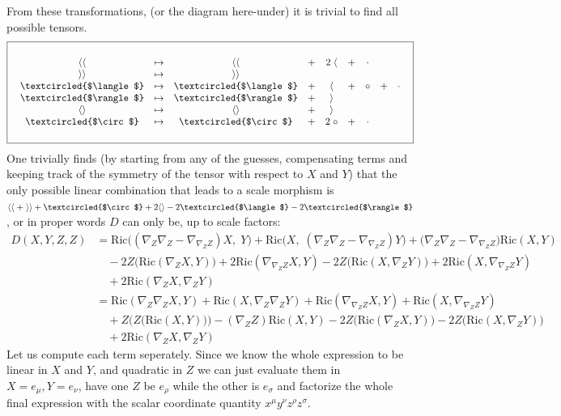 \documentclass[a4paper,11pt]{article}
\numberwithin{equation}{section}
\theoremstyle{definition}
\newcommand{\R}{{\mathrm{Ric}}}
\begin{document}
From these transformations, (or the diagram here-under) it is trivial to find all possible tensors.
\begin{equation}
\boxed{\quad \begin{matrix}
    \quad\\
    \langle\langle & \mapsto  &   \langle\langle & + & 2 \; \langle & + & \cdot \\
    \rangle\rangle & \mapsto &   \rangle\rangle \\
    \textcircled{$\langle$} & \mapsto &   \textcircled{$\langle$} & + & \langle & + & \circ & + & \cdot \\
    \textcircled{$\rangle$} & \mapsto &   \textcircled{$\rangle$} & + & \rangle  \\
    \langle\rangle & \mapsto &   \langle\rangle & + & \rangle \\
    \textcircled{$\circ$} & \mapsto &   \textcircled{$\circ$} & + & 2 \; \circ & + & \cdot\\
    \quad
\end{matrix}\quad }
\end{equation}
One trivially finds (by starting from any of the guesses, compensating terms and keeping track of the symmetry of the tensor with respect to $X$ and $Y$) that the only possible linear combination that leads to a scale morphism is $\langle\langle \; + \;\rangle\rangle+\textcircled{$\circ$} + 2 \langle\rangle - 2 \textcircled{$\langle$}- 2 \textcircled{$\rangle$}$, or in proper words $D$ can only be, up to scale factors:
\begin{align*}
    D(X,Y,Z,Z) &= \R\big((\nabla_Z\nabla_Z-\nabla_{\nabla_Z Z}) X,\;Y\big)
    + \R\big( X,\;(\nabla_Z\nabla_Z-\nabla_{\nabla_Z Z})Y\big)
    + \big(\nabla_Z\nabla_Z-\nabla_{\nabla_Z Z}\big)\R(X,Y)\\
    & \quad -2 Z\big(\R(\nabla_Z X, Y)\big)
    +2 \R(\nabla_{\nabla_ZZ} X,Y) 
    -2 Z\big(\R(X, \nabla_Z Y)\big)
    +2 \R( X,\nabla_{\nabla_ZZ}Y) \\
    & \quad + 2 \R(\nabla_Z X, \nabla_Z Y)\\
    &=\R(\nabla_Z\nabla_Z X,Y)
    + \R( X,\nabla_Z\nabla_ZY)
    + \R(\nabla_{\nabla_ZZ} X,Y)
    + \R( X,\nabla_{\nabla_ZZ}Y)\\
    & \quad + Z\big(Z\big(\R(X,Y)\big)\big)-(\nabla_Z Z)\R(X,Y)
    -2 Z\big(\R(\nabla_Z X, Y)\big)
    -2 Z\big(\R(X, \nabla_Z Y)\big) \\
    & \quad + 2 \R(\nabla_Z X, \nabla_Z Y) 
\end{align*}
Let us compute each term seperately. Since we know the whole expression to be linear in $X$ and $Y$, and quadratic in $Z$ we can just evaluate them in $X=e_\mu,Y=e_\nu$, have one $Z$ be $e_\rho$ while the other is $e_\sigma$ and factorize the whole final expression with the scalar coordinate quantity $x^\mu y^\nu z^\rho z^\sigma$.
\end{document}
